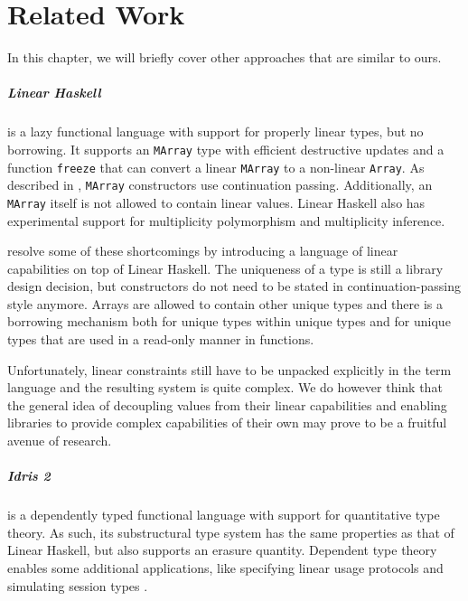 \chapter{Related Work}\label{sec:relatedwork}
In this chapter, we will briefly cover other approaches that are similar to ours.

\paragraph{Linear Haskell} is a lazy functional language with support for properly linear types, but no borrowing. It supports an \lstinline|MArray| type with efficient destructive updates and a function \lstinline|freeze| that can convert a linear \lstinline|MArray| to a non-linear \lstinline|Array|. As described in , \lstinline|MArray| constructors use continuation passing. Additionally, an \lstinline|MArray| itself is not allowed to contain linear values. Linear Haskell also has experimental support for multiplicity polymorphism and multiplicity inference.

\cite{spiwack_linearly_2022} resolve some of these shortcomings by introducing a language of linear capabilities on top of Linear Haskell. The uniqueness of a type is still a library design decision, but constructors do not need to be stated in continuation-passing style anymore. Arrays are allowed to contain other unique types and there is a borrowing mechanism both for unique types within unique types and for unique types that are used in a read-only manner in functions. 

Unfortunately, linear constraints still have to be unpacked explicitly in the term language and the resulting system is quite complex. We do however think that the general idea of decoupling values from their linear capabilities and enabling libraries to provide complex capabilities of their own may prove to be a fruitful avenue of research.

\paragraph{Idris 2 \citep{brady_idris_2021}} is a dependently typed functional language with support for quantitative type theory. As such, its substructural type system has the same properties as that of Linear Haskell, but also supports an erasure quantity. Dependent type theory enables some additional applications, like specifying linear usage protocols and simulating session types \citep{honda_types_1993}.

